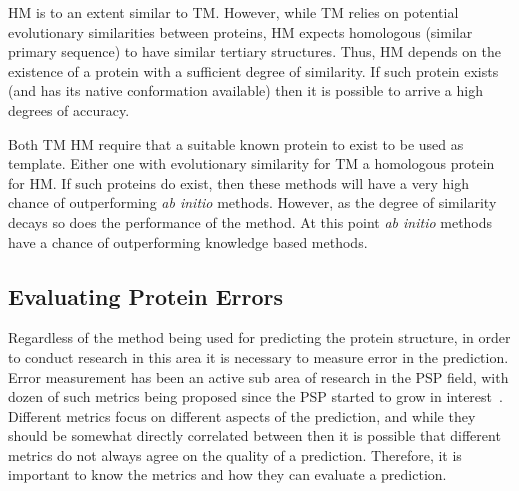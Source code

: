 \ac{HM} is to an extent similar to \ac{TM}. However, while \ac{TM} relies on
potential evolutionary similarities between proteins, HM expects homologous
(similar primary sequence) to have similar tertiary structures. Thus, HM
depends on the existence of a protein with a sufficient degree of similarity.
If such protein exists (and has its native conformation available) then it is
possible to arrive a high degrees of accuracy.

Both \ac{TM} HM require that a suitable known protein to exist to be used as
template. Either one with evolutionary similarity for \ac{TM} a homologous
protein for HM. If such proteins do exist, then these methods will have a very
high chance of outperforming \textit{ab initio} methods. However, as the degree
of similarity decays so does the performance of the method. At this point
\textit{ab initio} methods have a chance of outperforming knowledge based
methods.

\subsection{Evaluating Protein Errors}\label{sec:protein-metrics}

Regardless of the method being used for predicting the protein structure, in
order to conduct research in this area it is necessary to measure error in the
prediction. Error measurement has been an active sub area of research in the
\ac{PSP} field, with dozen of such metrics being proposed since the \ac{PSP}
started to grow in
interest~\cite{xu2010significant,zhang2005tm,siew2000maxsub}.  Different
metrics focus on different aspects of the prediction, and while they should be
somewhat directly correlated between then it is possible that different metrics
do not always agree on the quality of a prediction. Therefore, it is important
to know the metrics and how they can evaluate a prediction.

